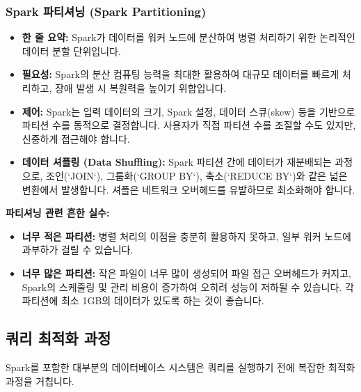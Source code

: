 \documentclass[11pt,a4paper]{article}
\begin{document}
\subsubsection{Spark 파티셔닝 (Spark Partitioning)}
\begin{itemize}
    \item \textbf{한 줄 요약:} Spark가 데이터를 워커 노드에 분산하여 병렬 처리하기 위한 논리적인 데이터 분할 단위입니다.
    \item \textbf{필요성:} Spark의 분산 컴퓨팅 능력을 최대한 활용하여 대규모 데이터를 빠르게 처리하고, 장애 발생 시 복원력을 높이기 위함입니다.
    \item \textbf{제어:} Spark는 입력 데이터의 크기, Spark 설정, 데이터 스큐(skew) 등을 기반으로 파티션 수를 동적으로 결정합니다. 사용자가 직접 파티션 수를 조절할 수도 있지만, 신중하게 접근해야 합니다.
    \item \textbf{데이터 셔플링 (Data Shuffling):} Spark 파티션 간에 데이터가 재분배되는 과정으로, 조인(`JOIN`), 그룹화(`GROUP BY`), 축소(`REDUCE BY`)와 같은 넓은 변환에서 발생합니다. 셔플은 네트워크 오버헤드를 유발하므로 최소화해야 합니다.
\end{itemize}

\begin{warningbox}
\textbf{파티셔닝 관련 흔한 실수:}
\begin{itemize}
    \item \textbf{너무 적은 파티션:} 병렬 처리의 이점을 충분히 활용하지 못하고, 일부 워커 노드에 과부하가 걸릴 수 있습니다.
    \item \textbf{너무 많은 파티션:} 작은 파일이 너무 많이 생성되어 파일 접근 오버헤드가 커지고, Spark의 스케줄링 및 관리 비용이 증가하여 오히려 성능이 저하될 수 있습니다. 각 파티션에 최소 1GB의 데이터가 있도록 하는 것이 좋습니다.
\end{itemize}
\end{warningbox}

\subsection{쿼리 최적화 과정}
Spark를 포함한 대부분의 데이터베이스 시스템은 쿼리를 실행하기 전에 복잡한 최적화 과정을 거칩니다.
\end{document}
